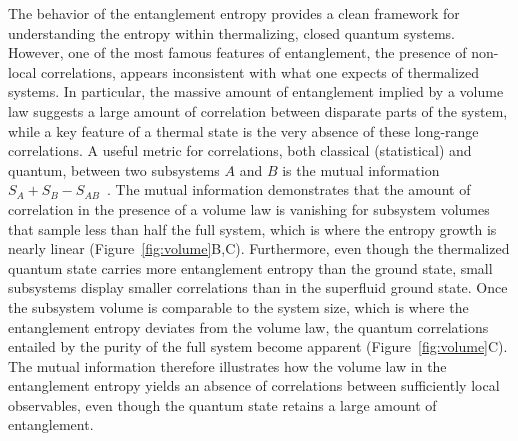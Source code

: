 The behavior of the entanglement entropy provides a clean framework for understanding the entropy within thermalizing, closed quantum systems. However, one of the most famous features of entanglement, the presence of non-local correlations, appears inconsistent with what one expects of thermalized systems. In particular, the massive amount of entanglement implied by a volume law suggests a large amount of correlation between disparate parts of the system, while a key feature of a thermal state is the very absence of these long-range correlations. A useful metric for correlations, both classical (statistical) and quantum, between two subsystems $A$ and $B$ is the mutual information $S_A +S_B - S_{AB}$~\cite{Wolf2008, Islam2015}. The mutual information demonstrates that the amount of correlation in the presence of a volume law is vanishing for subsystem volumes that sample less than half the full system, which is where the entropy growth is nearly linear (Figure~\ref{fig:volume}B,C). Furthermore, even though the thermalized quantum state carries more entanglement entropy than the ground state, small subsystems display smaller correlations than in the superfluid ground state. Once the subsystem volume is comparable to the system size, which is where the entanglement entropy deviates from the volume law, the quantum correlations entailed by the purity of the full system become apparent (Figure~\ref{fig:volume}C). The mutual information therefore illustrates how the volume law in the entanglement entropy yields an absence of correlations between sufficiently local observables, even though the quantum state retains a large amount of entanglement. 